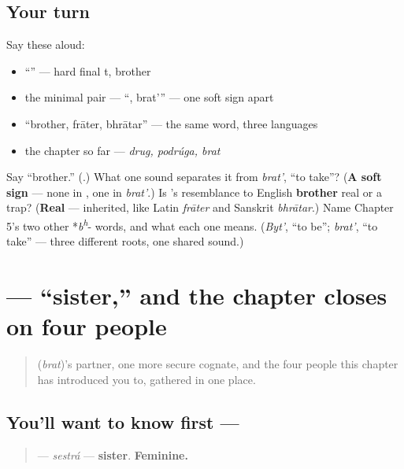 \subsection*{Your turn}
Say these aloud:

\begin{itemize}
\raggedright
  \item \textquotedblleft{}\textquotedblright{} — hard final t, brother
  \item the minimal pair — \textquotedblleft{}, brat'\textquotedblright{} — one soft sign apart
  \item \textquotedblleft{}brother, frāter, bhrātar\textquotedblright{} — the same word, three languages
  \item the chapter so far — \emph{drug, podrúga, brat}
\end{itemize}

\begin{tcolorbox}[breakable,colback=teal!4,colframe=teal!35!black,title={Before you move on}]
Say \textquotedblleft{}brother.\textquotedblright{} (\textbf{}.) What one sound separates it from \emph{brat'}, \textquotedblleft{}to take\textquotedblright{}? (\textbf{A soft sign} — none in \emph{}, one in \emph{brat'}.) Is \emph{}'s resemblance to English \textbf{brother} real or a trap? (\textbf{Real} — inherited, like Latin \emph{frāter} and Sanskrit \emph{bhrātar}.) Name Chapter 5's two other *\emph{b\textsuperscript{h}}- words, and what each one means. (\emph{Byt'}, \textquotedblleft{}to be\textquotedblright{}; \emph{brat'}, \textquotedblleft{}to take\textquotedblright{} — three different roots, one shared sound.)
\end{tcolorbox}
\section[\texorpdfstring{\ru{сестра} (sestrá)}{сестра (sestrá)}]{ — \textquotedblleft{}sister,\textquotedblright{} and the chapter closes on four people}

\label{lesson:RU-C07-sestra}



\begin{quote}
\textbf{} (\emph{brat})'s partner, one more secure cognate, and the four people this chapter has introduced you to, gathered in one place.
\end{quote}

\subsection*{You'll want to know first — }
\begin{quote}
\textbf{} — \emph{sestrá} — \textbf{sister}. \textbf{Feminine.}
\end{quote}

